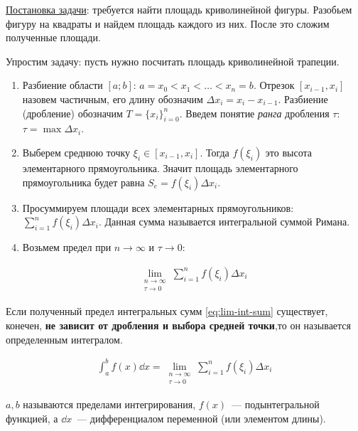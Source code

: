 
\underline{Постановка задачи}: требуется найти площадь криволинейной фигуры.
Разобьем фигуру на квадраты и найдем площадь каждого из них. После это сложим
полученные площади.



Упростим задачу: пусть нужно посчитать площадь криволинейной трапеции.

\begin{twocolumns}
  
  \columnbreak

  \begin{enumerate}
    \item Разбиение области \([a;b]\):
    \(a = x_{0} < x_{1} < \dotsc < x_{n} = b\).
    Отрезок \([x_{i - 1}, x_{i}]\) назовем частичным, его длину обозначим 
    \(\Delta x_{i} = x_{i} - x_{i - 1}\).
    Разбиение (дробление) обозначим \(T = \{ x_{i} \}_{i = 0}^{n}\). Введем
    понятие \textit{ранга} дробления \(\tau\): \(\tau = \max \Delta x_{i}\).

    \item Выберем среднюю точку \(\xi_{i} \in [x_{i - 1}, x_{i}]\). Тогда
    \(f(\xi_{i})\) это высота элементарного прямоугольника. Значит площадь
    элементарного прямоугольника будет равна
    \(S_{e} = f(\xi_{i}) \Delta x_{i}\).

    \item Просуммируем площади всех элементарных прямоугольников:
    \(\sum_{i = 1}^{n} f(\xi_{i}) \Delta x_{i}\). Данная сумма называется
    интегральной суммой Римана.

    \item Возьмем предел при \(n \to \infty\) и \(\tau \to 0\):
    
    \begin{align*}\label{eq:lim-int-sum}\tag{1}
      \lim_{\substack{n \to \infty \\ \tau \to 0}}
        \sum_{i = 1}^{n} f(\xi_{i}) \Delta x_{i}
    \end{align*}
  \end{enumerate}
\end{twocolumns}

\begin{definition}
  Если полученный предел интегральных сумм \eqref{eq:lim-int-sum} существует,
  конечен, \textbf{не зависит от дробления и выбора средней точки},то он
  называется определенным интегралом.

  \begin{align*}
    \int_{a}^{b} f(x) \dd x = \lim_{\substack{n \to \infty \\ \tau \to 0}}
      \sum_{i = 1}^{n} f(\xi_{i}) \Delta x_{i}
  \end{align*}

  \(a, b\) называются пределами интегрирования, \(f(x)\)~--- подынтегральной
  функцией, а \(\dd x\)~--- дифференциалом переменной (или элементом длины).
\end{definition}

